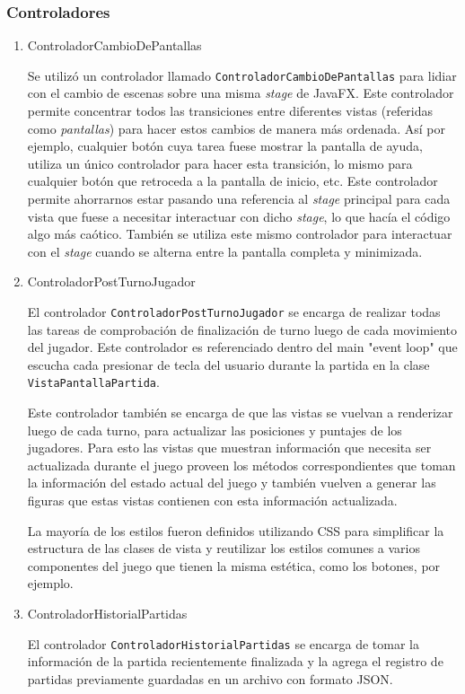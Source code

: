 \documentclass[titlepage,a4paper]{article}
\begin{document}
\subsubsection{Controladores}
\label{sec:org81efd79}

\begin{enumerate}
\item ControladorCambioDePantallas
\label{sec:org64c2a40}

Se utilizó un controlador llamado \texttt{ControladorCambioDePantallas} para
lidiar con el cambio de escenas sobre una misma \emph{stage} de
JavaFX. Este controlador permite concentrar todos las transiciones
entre diferentes vistas (referidas como \emph{pantallas}) para hacer estos
cambios de manera más ordenada. Así por ejemplo, cualquier botón cuya
tarea fuese mostrar la pantalla de ayuda, utiliza un único controlador
para hacer esta transición, lo mismo para cualquier botón que
retroceda a la pantalla de inicio, etc. Este controlador permite
ahorrarnos estar pasando una referencia al \emph{stage} principal para cada
vista que fuese a necesitar interactuar con dicho \emph{stage}, lo que hacía
el código algo más caótico. También se utiliza este mismo controlador
para interactuar con el \emph{stage} cuando se alterna entre la pantalla
completa y minimizada.

\item ControladorPostTurnoJugador
\label{sec:org4ab3f79}

El controlador \texttt{ControladorPostTurnoJugador} se encarga de realizar
todas las tareas de comprobación de finalización de turno luego de
cada movimiento del jugador. Este controlador es referenciado dentro
del main "event loop" que escucha cada presionar de tecla del usuario
durante la partida en la clase \texttt{VistaPantallaPartida}.

Este controlador también se encarga de que las vistas se vuelvan a
renderizar luego de cada turno, para actualizar las posiciones y
puntajes de los jugadores. Para esto las vistas que muestran
información que necesita ser actualizada durante el juego proveen los
métodos correspondientes que toman la información del estado actual
del juego y también vuelven a generar las figuras que estas vistas
contienen con esta información actualizada.

La mayoría de los estilos fueron definidos utilizando CSS para
simplificar la estructura de las clases de vista y reutilizar los
estilos comunes a varios componentes del juego que tienen la misma
estética, como los botones, por ejemplo.

\item ControladorHistorialPartidas
\label{sec:orgc8f908e}

El controlador \texttt{ControladorHistorialPartidas} se encarga de tomar la
información de la partida recientemente finalizada y la agrega el
registro de partidas previamente guardadas en un archivo con formato
JSON.
\end{enumerate}
\end{document}
